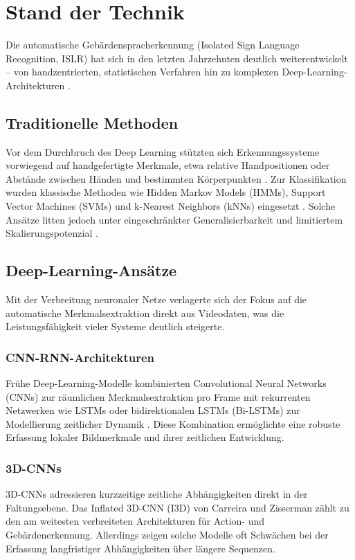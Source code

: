 \chapter{Stand der Technik}
\label{ch:state_of_the_art}

Die automatische Gebärdenspracherkennung (Isolated Sign Language Recognition, ISLR) hat sich in den letzten Jahrzehnten deutlich weiterentwickelt – von handzentrierten, statistischen Verfahren hin zu komplexen Deep-Learning-Architekturen \cite{dafnis2022}.

\section{Traditionelle Methoden}
Vor dem Durchbruch des Deep Learning stützten sich Erkennungssysteme vorwiegend auf handgefertigte Merkmale, etwa relative Handpositionen oder Abstände zwischen Händen und bestimmten Körperpunkten \cite{vogler2001}. Zur Klassifikation wurden klassische Methoden wie Hidden Markov Models (HMMs), Support Vector Machines (SVMs) und k-Nearest Neighbors (kNNs) eingesetzt \cite{starner1998, vogler2001}. Solche Ansätze litten jedoch unter eingeschränkter Generalisierbarkeit und limitiertem Skalierungspotenzial \cite{bowden2004}.

\section{Deep-Learning-Ansätze}
Mit der Verbreitung neuronaler Netze verlagerte sich der Fokus auf die automatische Merkmalsextraktion direkt aus Videodaten, was die Leistungsfähigkeit vieler Systeme deutlich steigerte.

\subsection{CNN-RNN-Architekturen}
Frühe Deep-Learning-Modelle kombinierten Convolutional Neural Networks (CNNs) zur räumlichen Merkmalsextraktion pro Frame mit rekurrenten Netzwerken wie LSTMs oder bidirektionalen LSTMs (Bi-LSTMs) zur Modellierung zeitlicher Dynamik \cite{pigou2014}. Diese Kombination ermöglichte eine robuste Erfassung lokaler Bildmerkmale und ihrer zeitlichen Entwicklung.

\subsection{3D-CNNs}
3D-CNNs adressieren kurzzeitige zeitliche Abhängigkeiten direkt in der Faltungsebene. Das Inflated 3D-CNN (I3D) von Carreira und Zisserman \cite{carreira2017} zählt zu den am weitesten verbreiteten Architekturen für Action- und Gebärdenerkennung. Allerdings zeigen solche Modelle oft Schwächen bei der Erfassung langfristiger Abhängigkeiten über längere Sequenzen.

